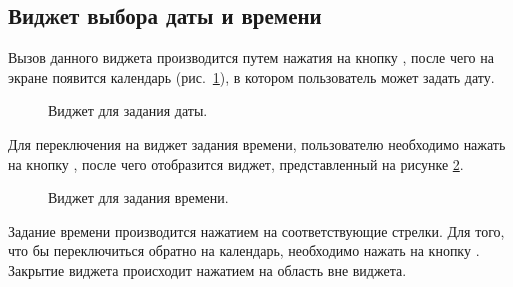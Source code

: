 \subsection{Виджет выбора даты и времени}
\label{widget:date_time_picker}
Вызов данного виджета производится путем нажатия на кнопку , после чего на экране появится календарь (рис.~\ref{img:widgets:date_time_picker_date}), в котором пользователь может задать дату.
\begin{figure}[H]
	\caption{Виджет для задания даты.}
	\label{img:widgets:date_time_picker_date}
\end{figure}

Для переключения на виджет задания времени, пользователю необходимо нажать на кнопку , после чего отобразится виджет, представленный на рисунке \ref{img:widgets:date_time_picker_time}.
\begin{figure}[H]
	\caption{Виджет для задания времени.}
	\label{img:widgets:date_time_picker_time}
\end{figure}

Задание времени производится нажатием на соответствующие стрелки. Для того, что бы переключиться обратно на календарь, необходимо нажать на кнопку . Закрытие виджета происходит нажатием на область вне виджета.
